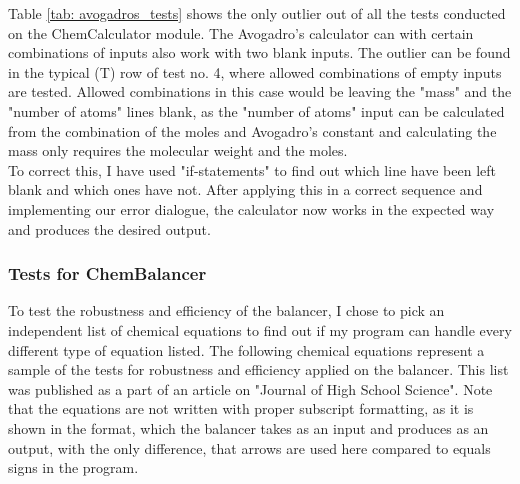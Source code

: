 \documentclass[a4paper,12pt]{article}
\begin{document}
Table \ref{tab: avogadros_tests} shows the only outlier out of all the tests conducted on the ChemCalculator module. The Avogadro's calculator can with certain combinations of inputs also work with two blank inputs. The outlier can be found in the typical (T) row of test no. 4, where allowed combinations of empty inputs are tested. Allowed combinations in this case would be leaving the "mass" and the "number of atoms" lines blank, as the "number of atoms" input can be calculated from the combination of the moles and Avogadro's constant and calculating the mass only requires the molecular weight and the moles.\\
To correct this, I have used "if-statements" to find out which line have been left blank and which ones have not. After applying this in a correct sequence and implementing our error dialogue, the calculator now works in the expected way and produces the desired output.

\subsubsection{Tests for ChemBalancer}

To test the robustness and efficiency of the balancer, I chose to pick an independent list of chemical equations to find out if my program can handle every different type of equation listed.
The following chemical equations represent a sample of the tests for robustness and efficiency applied on the balancer. This list was published as a part of an article on "Journal of High School Science". Note that the equations are not written with proper subscript formatting, as it is shown in the format, which the balancer takes as an input and produces as an output, with the only difference, that arrows are used here compared to equals signs in the program.
\end{document}
